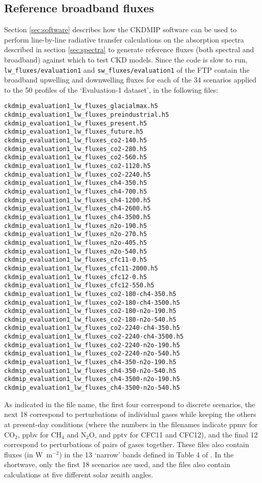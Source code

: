 \documentclass[twoside]{article}
\def\codesize{\small}
\def\code#1{{\codesize\texttt{#1}}}
\begin{document}
\subsection{Reference broadband fluxes}
\label{sec:fluxes}
Section \ref{sec:software} describes how the CKDMIP software can be
used to perform line-by-line radiative transfer calculations on the
absorption spectra described in section \ref{sec:spectra} to generate
reference fluxes (both spectral and broadband) against which to test
CKD models. Since the code is slow to run,
\code{lw\_fluxes/evaluation1} and \code{sw\_fluxes/evaluation1} of the
FTP contain the broadband upwelling and downwelling fluxes for each of
the 34 scenarios \cite[see Table 2 of][]{Hogan+2020} applied to the 50
profiles of the `Evaluation-1 dataset', in the following files:
%
\begin{verbatim}
ckdmip_evaluation1_lw_fluxes_glacialmax.h5
ckdmip_evaluation1_lw_fluxes_preindustrial.h5
ckdmip_evaluation1_lw_fluxes_present.h5
ckdmip_evaluation1_lw_fluxes_future.h5
ckdmip_evaluation1_lw_fluxes_co2-140.h5
ckdmip_evaluation1_lw_fluxes_co2-280.h5
ckdmip_evaluation1_lw_fluxes_co2-560.h5
ckdmip_evaluation1_lw_fluxes_co2-1120.h5
ckdmip_evaluation1_lw_fluxes_co2-2240.h5
ckdmip_evaluation1_lw_fluxes_ch4-350.h5
ckdmip_evaluation1_lw_fluxes_ch4-700.h5
ckdmip_evaluation1_lw_fluxes_ch4-1200.h5
ckdmip_evaluation1_lw_fluxes_ch4-2600.h5
ckdmip_evaluation1_lw_fluxes_ch4-3500.h5
ckdmip_evaluation1_lw_fluxes_n2o-190.h5
ckdmip_evaluation1_lw_fluxes_n2o-270.h5
ckdmip_evaluation1_lw_fluxes_n2o-405.h5
ckdmip_evaluation1_lw_fluxes_n2o-540.h5
ckdmip_evaluation1_lw_fluxes_cfc11-0.h5
ckdmip_evaluation1_lw_fluxes_cfc11-2000.h5
ckdmip_evaluation1_lw_fluxes_cfc12-0.h5
ckdmip_evaluation1_lw_fluxes_cfc12-550.h5
ckdmip_evaluation1_lw_fluxes_co2-180-ch4-350.h5
ckdmip_evaluation1_lw_fluxes_co2-180-ch4-3500.h5
ckdmip_evaluation1_lw_fluxes_co2-180-n2o-190.h5
ckdmip_evaluation1_lw_fluxes_co2-180-n2o-540.h5
ckdmip_evaluation1_lw_fluxes_co2-2240-ch4-350.h5
ckdmip_evaluation1_lw_fluxes_co2-2240-ch4-3500.h5
ckdmip_evaluation1_lw_fluxes_co2-2240-n2o-190.h5
ckdmip_evaluation1_lw_fluxes_co2-2240-n2o-540.h5
ckdmip_evaluation1_lw_fluxes_ch4-350-n2o-190.h5
ckdmip_evaluation1_lw_fluxes_ch4-350-n2o-540.h5
ckdmip_evaluation1_lw_fluxes_ch4-3500-n2o-190.h5
ckdmip_evaluation1_lw_fluxes_ch4-3500-n2o-540.h5
\end{verbatim}
%
As indicated in the file name, the first four correspond to discrete
scenarios, the next 18 correspond to perturbations of individual gases
while keeping the others at present-day conditions (where the numbers
in the filenames indicate ppmv for CO$_2$, ppbv for CH$_4$ and N$_2$O,
and pptv for CFC11 and CFC12), and the final 12 correspond to
perturbations of pairs of gases together. These files also contain
fluxes (in W~m$^{-2}$) in the 13 `narrow' bands defined in Table 4 of
\cite{Hogan+2020}. In the shortwave, only the first 18 scenarios are
used, and the files also contain calculations at five different solar
zenith angles.
\end{document}
